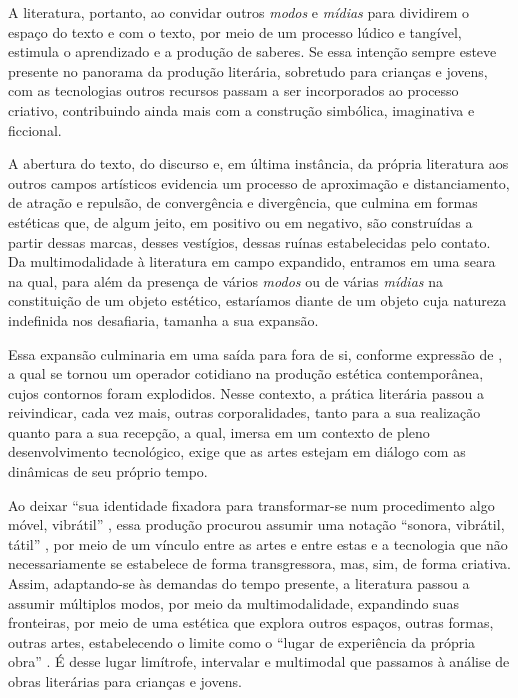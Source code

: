 \documentclass[portuguese]{textolivre}
\begin{document}
A literatura, portanto, ao convidar outros \textit{modos} e \textit{mídias}
para dividirem o espaço do texto e com o texto, por meio de um processo lúdico
e tangível, estimula o aprendizado e a produção de saberes. Se essa intenção
sempre esteve presente no panorama da produção literária, sobretudo para
crianças e jovens, com as tecnologias outros recursos passam a ser incorporados
ao processo criativo, contribuindo ainda mais com a construção simbólica,
imaginativa e ficcional.

A abertura do texto, do discurso e, em última instância, da própria literatura
aos outros campos artísticos evidencia um processo de aproximação e
distanciamento, de atração e repulsão, de convergência e divergência, que
culmina em formas estéticas que, de algum jeito, em positivo ou em negativo,
são construídas a partir dessas marcas, desses vestígios, dessas ruínas
estabelecidas pelo contato. Da multimodalidade à literatura em campo expandido,
entramos em uma seara na qual, para além da presença de vários \textit{modos}
ou de várias \textit{mídias} na constituição de um objeto estético, estaríamos
diante de um objeto cuja natureza indefinida nos desafiaria, tamanha a sua
expansão.

Essa expansão culminaria em uma saída para fora de si, conforme expressão de
\textcite{kiffer_2014}, a qual se tornou um operador cotidiano na produção
estética contemporânea, cujos contornos foram explodidos. Nesse contexto, a
prática literária passou a reivindicar, cada vez mais, outras corporalidades,
tanto para a sua realização quanto para a sua recepção, a qual, imersa em um
contexto de pleno desenvolvimento tecnológico, exige que as artes estejam em
diálogo com as dinâmicas de seu próprio tempo. 

Ao deixar “sua identidade fixadora para transformar-se num procedimento algo
móvel, vibrátil” \cite[p.~55]{kiffer_2014}, essa produção procurou assumir uma
notação “sonora, vibrátil, tátil” \cite[p.~54]{kiffer_2014}, por meio de um
vínculo entre as artes e entre estas e a tecnologia que não necessariamente se
estabelece de forma transgressora, mas, sim, de forma criativa. Assim,
adaptando-se às demandas do tempo presente, a literatura passou a assumir
múltiplos modos, por meio da multimodalidade, expandindo suas fronteiras, por
meio de uma estética que explora outros espaços, outras formas, outras artes,
estabelecendo o limite como o “lugar de experiência da própria obra”
\cite[p.~13]{kiffer_Garramuno_2014}. É desse lugar limítrofe, intervalar e
multimodal que passamos à análise de obras literárias para crianças e jovens.
\end{document}
